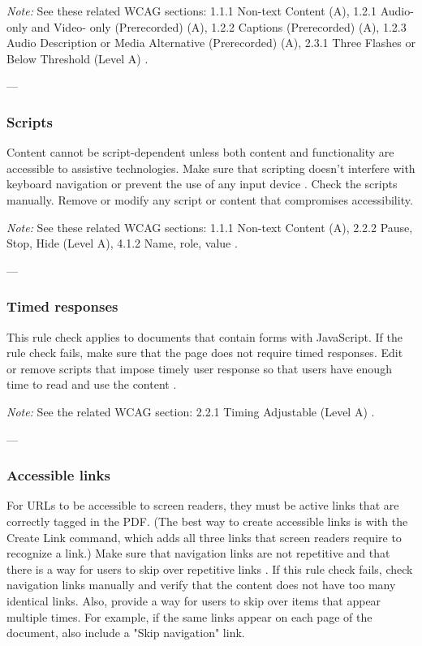 \vspace{0.5em}
\noindent\textit{Note:} See these related WCAG sections: 1.1.1 Non-text Content (A), 1.2.1 Audio- only and Video- only (Prerecorded) (A), 1.2.2 Captions (Prerecorded) (A), 1.2.3 Audio Description or Media Alternative (Prerecorded) (A), 2.3.1 Three Flashes or Below Threshold (Level A) \cite{WCAG}.

---

\subsubsection{Scripts}
\label{subsubsec:acrobat-scripts}
Content cannot be script-dependent unless both content and functionality are accessible to assistive technologies. Make sure that scripting doesn't interfere with keyboard navigation or prevent the use of any input device \cite{AdobeHelpX}.
Check the scripts manually. Remove or modify any script or content that compromises accessibility.

\vspace{0.5em}
\noindent\textit{Note:} See these related WCAG sections: 1.1.1 Non-text Content (A), 2.2.2 Pause, Stop, Hide (Level A), 4.1.2 Name, role, value \cite{WCAG}.

---

\subsubsection{Timed responses}
\label{subsubsec:acrobat-timed-responses}
This rule check applies to documents that contain forms with JavaScript. If the rule check fails, make sure that the page does not require timed responses. Edit or remove scripts that impose timely user response so that users have enough time to read and use the content \cite{AdobeHelpX}.

\vspace{0.5em}
\noindent\textit{Note:} See the related WCAG section: 2.2.1 Timing Adjustable (Level A) \cite{WCAG}.

---

\subsubsection{Accessible links}
\label{subsubsec:acrobat-accessible-links}
For URLs to be accessible to screen readers, they must be active links that are correctly tagged in the PDF. (The best way to create accessible links is with the Create Link command, which adds all three links that screen readers require to recognize a link.) Make sure that navigation links are not repetitive and that there is a way for users to skip over repetitive links \cite{AdobeHelpX}.
If this rule check fails, check navigation links manually and verify that the content does not have too many identical links. Also, provide a way for users to skip over items that appear multiple times. For example, if the same links appear on each page of the document, also include a "Skip navigation" link.

